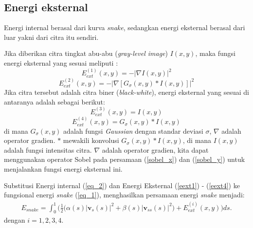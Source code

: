 \subsection{Energi eksternal}
Energi internal berasal dari kurva \emph{snake}, sedangkan energi eksternal berasal dari luar yakni dari citra itu sendiri.

Jika diberikan citra tingkat abu-abu (\emph{gray-level image}) $I (x, y)$, maka fungsi energi eksternal yang sesuai meliputi \citep{xu1998snakes:22}:
\begin{equation}
	\label{eext1}
	E^{(1)}_{ext}(x,y) = -|\nabla I(x,y)|^2
\end{equation}
\begin{equation}
	\label{eext2}
	E^{(2)}_{ext}(x,y) =  -|\nabla \left[ G_{\sigma} (x,y) * I(x,y) \right]|^2
\end{equation}
Jika citra tersebut adalah citra biner (\emph{black-white}), energi eksternal yang sesuai di antaranya adalah sebagai berikut:
\begin{equation}
	\label{eext3}
	E^{(3)}_{ext}(x,y) = I(x,y)
\end{equation}
\begin{equation}
	\label{eext4}
	E^{(4)}_{ext}(x,y) = G_{\sigma} (x,y) * I(x,y)
\end{equation}
di mana $G_{\sigma}(x,y)$ adalah fungsi \emph{Gaussian} dengan standar deviasi $\sigma$, $\nabla$ adalah operator gradien. $\ast$ mewakili konvolusi $G_{\sigma}(x,y) \ast I(x,y)$, di mana $I(x,y)$ adalah fungsi intensitas citra. $\nabla$ adalah operator gradien, kita dapat menggunakan operator Sobel pada persamaan (\ref{sobel_x}) dan (\ref{sobel_y}) untuk menjalankan fungsi energi eksternal ini.

Substitusi Energi internal (\ref{eq_2}) dan Energi Eksternal (\ref{eext1}) - (\ref{eext4}) ke fungsional energi \emph{snake} (\ref{eq_1}), menghasilkan persamaan energi \emph{snake} menjadi:
\begin{multline}
\label{eq_4}
E_{snake} = \int^{1}_{0} \Biggl( \frac{1}{2} \biggl(\alpha(s)|\textbf{v}_{s}(s)|^2 + \beta(s)|\textbf{v}_{ss}(s)|^2\biggr) + E^{(i)}_{ext}(x,y) \Biggr) ds.
\end{multline}
dengan $i = 1,2,3,4$.




